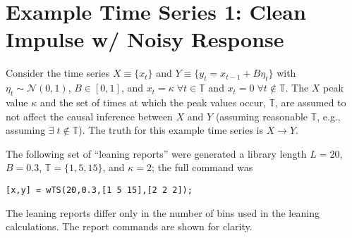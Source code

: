 \documentclass[a4paper,11pt]{article}
\begin{document}
\newpage
\section{Example Time Series 1: Clean Impulse w/ Noisy Response}
Consider the time series $X\equiv\{x_t\}$ and $Y\equiv\{y_t=x_{t-1}+B\eta_t\}$ with $\eta_t\sim \mathcal{N}(0,1)$, $B\in[0,1]$, and $x_t = \kappa\;\forall t\in\mathbb{T}$ and $x_t = 0\;\forall t\notin\mathbb{T}$.  The $X$ peak value $\kappa$ and the set of times at which the peak values occur, $\mathbb{T}$, are assumed to not affect the causal inference between $X$ and $Y$ (assuming reasonable $\mathbb{T}$, e.g., assuming $\exists\;t\notin\mathbb{T}$).  The truth for this example time series is $X\rightarrow Y$.

The following set of ``leaning reports'' were generated a library length $L=20$, $B=0.3$, $\mathbb{T} = \{1,5,15\}$, and $\kappa = 2$; the full command was 
\begin{verbatim}
[x,y] = wTS(20,0.3,[1 5 15],[2 2 2]);
\end{verbatim}
The leaning reports differ only in the number of bins used in the leaning calculations.  The report commands are shown for clarity.
\end{document}

